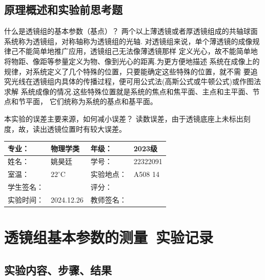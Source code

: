 \documentclass[dvipsnames, svgnames,a4paper,11pt]{article}
\begin{document}
\subsection{原理概述和实验前思考题}
\begin{question}
    什么是透镜组的基本参数（基点）？
    \tcblower
    两个以上薄透镜或者厚透镜组成的共轴球面系统称为透镜组，对称轴称为透镜组的光轴.
    对透镜组来说，单个薄透镜的成像规律己不能简单地推广应用，透镜组己无法像薄透镜那样
    定义光心，故不能简单地将物距、像距等参量定义为物、像到光心的距离.为更方便地描述
    系统在成像上的规律，对系统定义了几个特殊的位置，只要能确定这些特殊的位置，就不需
    要追究光线在透镜组内具体的传播过程，便可用公式法(高斯公式或牛顿公式)或作图法求解
    系统成像的情况.这些特殊位置就是系统的焦点和焦平面、主点和主平面、节点和节平面，
    它们统称为系统的基点和基平面。
\end{question}

\begin{question}
    本实验的误差主要来源，如何减小误差？
    \tcblower
    读数误差，由于透镜底座上未标出刻度，故，读出透镜位置时有较大误差。
\end{question}

\clearpage
{}
\begin{table}
	\renewcommand\arraystretch{1.7}
	\centering
	\begin{tabularx}{\textwidth}{|X|X|X|X|}
	\hline
	专业：& 物理学类 &年级：& 2023级 \\
	\hline
	姓名： &姚昊廷& 学号：&22322091  \\
	\hline
	室温：&$22^\circ$C&实验地点：&A508  14\\
	\hline
	学生签名：& & 评分： &\\
	\hline
	实验时间：& 2024.12.26& 教师签名：&\\
	\hline
	\end{tabularx}
\end{table}
\section{透镜组基本参数的测量\ \textbf{实验记录}}
\subsection{实验内容、步骤、结果}
\end{document}
